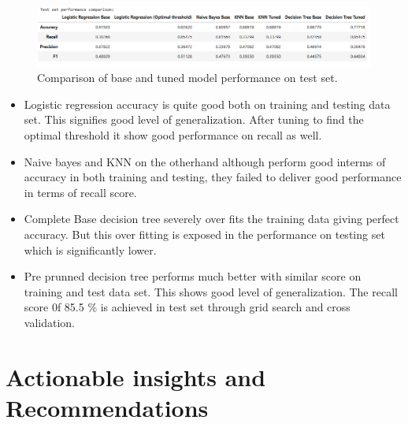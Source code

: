 \documentclass[12pt,a4paper]{article}
\begin{document}
	\begin{figure}[h]
		\centering
		\includegraphics[width=\linewidth]{test_perf_copmpare.png}
		\caption{Comparison of base and tuned model performance on test set.}
		\label{fig:test_perf_copmpare}
	\end{figure}
	
	\begin{itemize}
		\item Logistic regression accuracy is quite good both on training and testing data set. This signifies good level of generalization. After tuning to find the optimal threshold it show good performance on recall as well.
		\item Naive bayes and KNN on the otherhand although perform good interms of accuracy in both training and testing, they failed to deliver good performance in terms of recall score.
		\item Complete Base decision tree severely over fits the training data giving perfect accuracy. But this over fitting is exposed in the performance on testing set which is significantly lower.  
		\item Pre prunned decision tree performs much better with similar score on training and test data set. This shows good level of generalization. The recall score 0f 85.5 \% is achieved in test set through grid search and cross validation.
	\end{itemize}
	
	\section{Actionable insights and Recommendations}
\end{document}

